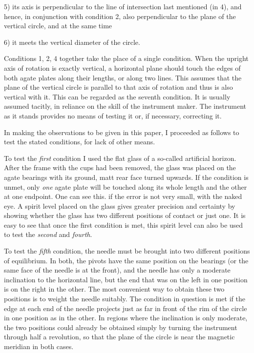 5) its axis is perpendicular to the line of intersection last mentioned (in 4), and hence, in conjunction with condition 2, also perpendicular to the plane of the vertical circle, and at the same time

6) it meets the vertical diameter of the circle.

Conditions 1, 2, 4 together take the place of a single condition. When the upright axis of rotation is exactly vertical, a horizontal plane should touch the edges of both agate plates along their lengths, or along two lines. This assumes that the plane of the vertical circle is parallel to that axis of rotation and thus is also vertical with it. This can be regarded as the seventh condition. It is usually assumed tacitly, in reliance on the skill of the instrument maker. The instrument as it stands provides no means of testing it or, if necessary, correcting it.

In making the observations to be given in this paper, I proceeded as follows to test the stated conditions, for lack of other means.

To test the \textit{first} condition I used the flat glass of a so-called artificial horizon. After the frame with the cups had been removed, the glass was placed on the agate bearings with its ground, matt rear face turned upwards. If the condition is unmet, only \textit{one} agate plate will be touched along its whole length and the other at one endpoint. One can see this. if the error is not very small, with the naked eye. A spirit level placed on the glass gives greater precision and certainty by showing whether the glass has two different positions of contact or just one. It is easy to see that once the first condition is met, this spirit level can also be used to test the \textit{second} and \textit{fourth}.

To test the \textit{fifth} condition, the needle must be brought into two different positions of equilibrium. In both, the pivots have the same position on the bearings (or the same face of the needle is at the front), and the needle has only a moderate inclination to the horizontal line, but the end that was on the left in one position is on the right in the other. The most convenient way to obtain these two positions is to weight the needle suitably. The condition in question is met if the edge at each end of the needle projects just as far in front of the rim of the circle in one position as in the other. In regions where the inclination is only moderate, the two positions could already be obtained simply by turning the instrument through half a revolution, so that the plane of the circle is near the magnetic meridian in both cases.

